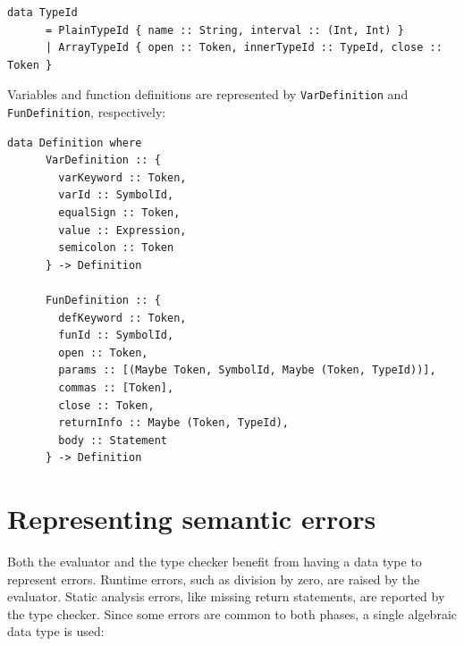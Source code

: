 \documentclass[UdineBachThesis,american,11pt]{PhdThesis}
\begin{document}
  \begin{Verbatim}[gobble=4,fontsize=\small]
    data TypeId
      = PlainTypeId { name :: String, interval :: (Int, Int) }
      | ArrayTypeId { open :: Token, innerTypeId :: TypeId, close :: Token }
  \end{Verbatim}

  Variables and function definitions are represented by
  \mbox{\texttt{VarDefinition}} and \mbox{\texttt{FunDefinition}}, respectively:

  \begin{Verbatim}[gobble=4,fontsize=\small]
    data Definition where
      VarDefinition :: {
        varKeyword :: Token,
        varId :: SymbolId,
        equalSign :: Token,
        value :: Expression,
        semicolon :: Token
      } -> Definition

      FunDefinition :: {
        defKeyword :: Token,
        funId :: SymbolId,
        open :: Token,
        params :: [(Maybe Token, SymbolId, Maybe (Token, TypeId))],
        commas :: [Token],
        close :: Token,
        returnInfo :: Maybe (Token, TypeId),
        body :: Statement
      } -> Definition
  \end{Verbatim}

  \section{Representing semantic errors}

  Both the evaluator and the type checker benefit from having a data type to
  represent errors. Runtime errors, such as division by zero, are raised by the
  evaluator. Static analysis errors, like missing return statements, are
  reported by the type checker. Since some errors are common to both phases, a
  single algebraic data type is used:
\end{document}
